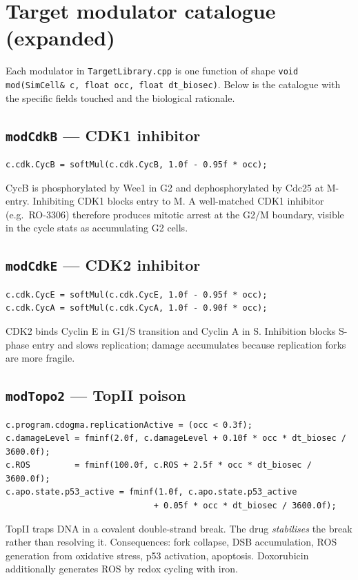\documentclass[11pt,letterpaper,twoside,openany]{book}
\newcommand{\code}[1]{\texttt{#1}}
\newcommand{\file}[1]{\texttt{\small#1}}
\begin{document}
\section{Target modulator catalogue (expanded)}

Each modulator in \file{TargetLibrary.cpp} is one function of shape
\code{void mod(SimCell\& c, float occ, float dt\_biosec)}. Below
is the catalogue with the specific fields touched and the
biological rationale.

\subsection{\code{modCdkB} --- CDK1 inhibitor}

\begin{lstlisting}
c.cdk.CycB = softMul(c.cdk.CycB, 1.0f - 0.95f * occ);
\end{lstlisting}
CycB is phosphorylated by Wee1 in G2 and dephosphorylated by Cdc25
at M-entry. Inhibiting CDK1 blocks entry to M. A well-matched CDK1
inhibitor (e.g.\ RO-3306) therefore produces mitotic arrest at the
G2/M boundary, visible in the cycle stats as accumulating G2 cells.

\subsection{\code{modCdkE} --- CDK2 inhibitor}

\begin{lstlisting}
c.cdk.CycE = softMul(c.cdk.CycE, 1.0f - 0.95f * occ);
c.cdk.CycA = softMul(c.cdk.CycA, 1.0f - 0.90f * occ);
\end{lstlisting}
CDK2 binds Cyclin E in G1/S transition and Cyclin A in S. Inhibition
blocks S-phase entry and slows replication; damage accumulates
because replication forks are more fragile.

\subsection{\code{modTopo2} --- TopII poison}

\begin{lstlisting}
c.program.cdogma.replicationActive = (occ < 0.3f);
c.damageLevel = fminf(2.0f, c.damageLevel + 0.10f * occ * dt_biosec / 3600.0f);
c.ROS         = fminf(100.0f, c.ROS + 2.5f * occ * dt_biosec / 3600.0f);
c.apo.state.p53_active = fminf(1.0f, c.apo.state.p53_active
                              + 0.05f * occ * dt_biosec / 3600.0f);
\end{lstlisting}
TopII traps DNA in a covalent double-strand break. The drug
\emph{stabilises} the break rather than resolving it. Consequences:
fork collapse, DSB accumulation, ROS generation from oxidative
stress, p53 activation, apoptosis. Doxorubicin additionally
generates ROS by redox cycling with iron.
\end{document}
